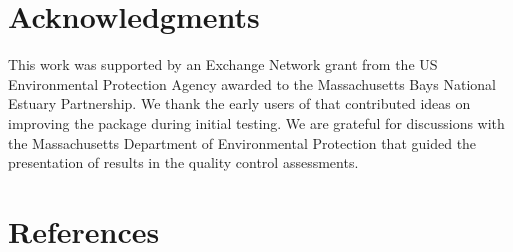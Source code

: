 \hypertarget{acknowledgments}{%
\section{Acknowledgments}\label{acknowledgments}}

This work was supported by an Exchange Network grant from the US Environmental Protection Agency awarded to the Massachusetts Bays National Estuary Partnership. We thank the early users of  that contributed ideas on improving the package during initial testing. We are grateful for discussions with the Massachusetts Department of Environmental Protection that guided the presentation of results in the quality control assessments.

\hypertarget{references}{%
\section*{References}\label{references}}

